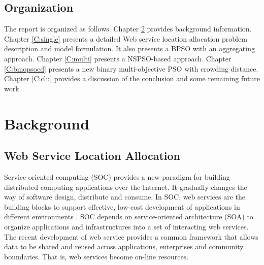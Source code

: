 \section{Organization}
The report is organized as follows. 
Chapter \ref{C:background} provides background information. 
Chapter \ref{C:single} presents a detailed Web service location allocation problem description and model formulation. 
It also presents a BPSO with an aggregating approach. 
Chapter \ref{C:multi} presents a NSPSO-based approach. 
Chapter \ref{C:bmopsocd} presents a new binary multi-objective PSO with crowding distance. 
Chapter \ref{C:clu} provides a discussion of the conclusion and some remaining future work.

\chapter{Background}
\label{C:background}
\section{Web Service Location Allocation}
Service-oriented computing (SOC) provides a new paradigm for building distributed computing applications over the Internet. It gradually changes
the way of software design, distribute and consume. In SOC, web services are the building blocks to support effective, low-cost development of applications
in different environments \cite{bougue}.
SOC depends on service-oriented architecture (SOA) to organize applications and infrastructures into a set of interacting web services. The recent development of web service provides a common framework that allows data to be shared and reused across applications, enterprises and community boundaries. That is, web services become on-line resources. 



